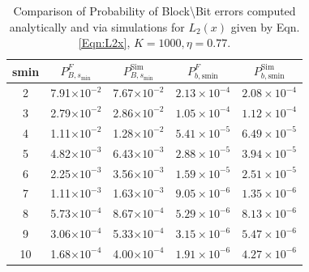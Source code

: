%

\begin{table}[!ht]
\centering
\begin{tabular}{c c c c c}
\hline  \hline
smin & $P_{B,s_{\text{min}}}^F$ & $P_{B,s_{\text{min}}}^{\text{Sim}}$& $P_{b,\text{smin}}^F$ & $P_{b,\text{smin}}^{\text{Sim}}$ \\
\hline
2 & 7.91$\times 10^{-2}$  &7.67$\times 10^{-2}$ &$2.13\times 10^{-4}$&$2.08\times 10^{-4}$\\
3 & 2.79$\times 10^{-2}$  &2.86$\times 10^{-2}$&$1.05\times 10^{-4}$&$1.12\times 10^{-4}$ \\
4 & 1.11$\times 10^{-2}$  &1.28$\times 10^{-2}$ &$5.41\times 10^{-5}$&$6.49\times 10^{-5}$\\
5 & 4.82$\times 10^{-3}$  &6.43$\times 10^{-3}$ & $2.88\times 10^{-5}$&$3.94\times 10^{-5}$\\
6 & 2.25$\times 10^{-3}$  &3.56$\times 10^{-3}$ &$1.59\times 10^{-5}$&$2.51\times 10^{-5}$\\
7 & 1.11$\times 10^{-3}$  &1.63$\times 10^{-3}$ &$9.05\times 10^{-6}$&$1.35\times 10^{-6}$\\
8 &5.73$\times 10^{-4}$   &8.67$\times 10^{-4}$ &$5.29\times 10^{-6}$&$8.13\times 10^{-6}$\\
9 & 3.06$\times 10^{-4}$  &5.33$\times 10^{-4}$ & $3.15\times 10^{-6}$&$5.47\times 10^{-6}$\\
10 & 1.68$\times 10^{-4}$ &4.00$\times 10^{-4}$&$1.91\times 10^{-6}$&$4.27\times 10^{-6}$\\
\end{tabular}
\caption{Comparison of Probability of Block\textbackslash Bit errors computed analytically and via simulations for $L_2(x)$ given by Eqn. \eqref{Eqn:L2x}, $K=1000, \eta=0.77$.}
\label{Table:SimvsAnalytic2}
\end{table}
%

